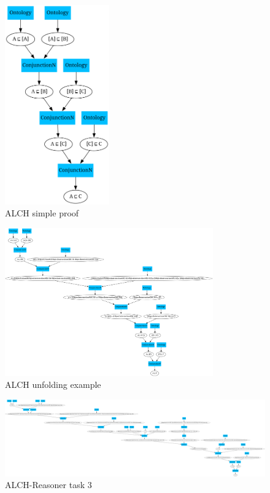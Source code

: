 \documentclass[titlepage]{article}
\begin{document}
 

\begin{figure}
  \centering
  \includegraphics[width=0.4\textwidth]{pictures/longerProofExample2_normalized.png}
  \caption{ALCH simple proof}
  \label{fig:simple_proof}
\end{figure}


\begin{figure}
  \centering
  \includegraphics[width=0.8\textwidth]{pictures/ALCH_task00000.png}
  \caption{ALCH unfolding example}
  \label{fig:unfold}
\end{figure}



\begin{figure}
  \centering
  \includegraphics[width=1\textwidth]{pictures/ALCH_task00003.png}
  \caption{ALCH-Reasoner task 3}
  \label{fig:alch_3}
\end{figure}
\end{document}
